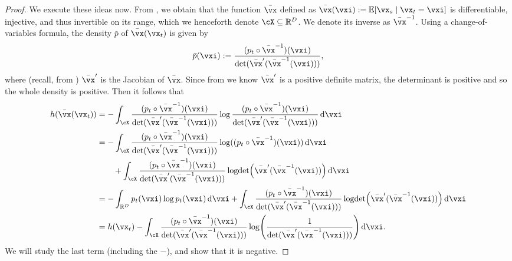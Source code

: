 \documentclass[../../book-main.tex]{subfiles}
\begin{document}
\begin{proof}
    We execute these ideas now. From , we obtain that the function \(\bar{\vx}\) defined as \(\bar{\vx}(\vxi) := \Ex[\vx_{s} \given \vx_{t} = \vxi]\) is differentiable, injective, and thus invertible on its range, which we henceforth denote \(\cX \subseteq \R^{D}\). We denote its inverse as \(\bar{\vx}^{-1}\). Using a change-of-variables formula, the density \(\bar{p}\) of \(\bar{\vx}(\vx_{t})\) is given by 
    \begin{equation}
        \bar{p}(\vxi) := \frac{(p_{t} \circ \bar{\vx}^{-1})(\vxi)}{\det(\bar{\vx}^{\prime}(\bar{\vx}^{-1}(\vxi)))},
    \end{equation}
    where (recall, from ) \(\bar{\vx}^{\prime}\) is the Jacobian of \(\bar{\vx}\). Since from  we know \(\bar{\vx}^{\prime}\) is a positive definite matrix, the determinant is positive and so the whole density is positive. Then it follows that 
    \begin{align}
        h(\bar{\vx}(\vx_{t}))
        &= -\int_{\cX}\frac{(p_{t} \circ \bar{\vx}^{-1})(\vxi)}{\det(\bar{\vx}^{\prime}(\bar{\vx}^{-1}(\vxi)))} \log \frac{(p_{t} \circ \bar{\vx}^{-1})(\vxi)}{\det(\bar{\vx}^{\prime}(\bar{\vx}^{-1}(\vxi)))} \odif{\vxi} \\ 
        &= -\int_{\cX}\frac{(p_{t} \circ \bar{\vx}^{-1})(\vxi)}{\det(\bar{\vx}^{\prime}(\bar{\vx}^{-1}(\vxi)))} \log((p_{t} \circ \bar{\vx}^{-1})(\vxi))\odif{\vxi} \\ 
        &\qquad + \int_{\cX}\frac{(p_{t} \circ \bar{\vx}^{-1})(\vxi)}{\det(\bar{\vx}^{\prime}(\bar{\vx}^{-1}(\vxi)))}\logdet\rp{\bar{\vx}^{\prime}(\bar{\vx}^{-1}(\vxi))}\odif{\vxi} \\ 
        &= -\int_{\R^{D}}p_{t}(\vxi)\log p_{t}(\vxi)\odif{\vxi} + \int_{\cX}\frac{(p_{t} \circ \bar{\vx}^{-1})(\vxi)}{\det(\bar{\vx}^{\prime}(\bar{\vx}^{-1}(\vxi)))}\logdet\rp{\bar{\vx}^{\prime}(\bar{\vx}^{-1}(\vxi))}\odif{\vxi} \\ 
        &= h(\vx_{t}) - \int_{\cX}\frac{(p_{t} \circ \bar{\vx}^{-1})(\vxi)}{\det(\bar{\vx}^{\prime}(\bar{\vx}^{-1}(\vxi)))}\log\rp{\frac{1}{\det(\bar{\vx}^{\prime}(\bar{\vx}^{-1}(\vxi)))}}\odif{\vxi}.
    \end{align}
    We will study the last term (including the \(-\)), and show that it is negative.


\end{proof}
\end{document}
